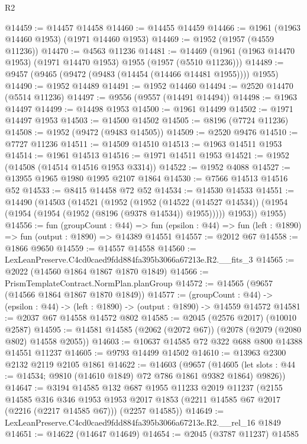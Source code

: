 \begin{lexlean}{R2}
\begin{coremodule}
@14459 := @14457 @14458
@14460 := @14455 @14459
@14466 := @1961 (@1963 @14460 @1953) (@1971 @14460 @1953)
@14469 := @1952 (@1957 (@4559 @11236))
@14470 := @4563 @11236
@14481 := @14469 (@1961 (@1963 @14470 @1953) (@1971 @14470 @1953) @1955 (@1957 (@5510 @11236)))
@14489 := @9457 (@9465 (@9472 (@9483 (@14454 (@14466 @14481 @1955)))) @1955)
@14490 := @1952 @14489
@14491 := @1952 @14460
@14494 := @2520 @14470 (@5514 @11236)
@14497 := @9556 (@9557 (@14491 @14494))
@14498 := @1963 @14497
@14499 := @14498 @1953
@14500 := @1961 @14499
@14502 := @1971 @14497 @1953
@14503 := @14500 @14502
@14505 := @8196 (@7724 @11236)
@14508 := @1952 (@9472 (@9483 @14505))
@14509 := @2520 @9476
@14510 := @7727 @11236
@14511 := @14509 @14510
@14513 := @1963 @14511 @1953
@14514 := @1961 @14513
@14516 := @1971 @14511 @1953
@14521 := @1952 (@14508 (@14514 @14516 @1953 @3314))
@14522 := @1952 @4088
@14527 := @13955 @1965 @1980 @1995 @2107 @1864
@14530 := @7566 @14513 @14516 @52
@14533 := @8415 @14458 @72 @52
@14534 := @14530 @14533
@14551 := @14490
    (@14503
      (@14521
        (@1952
          (@1952
            (@14522 (@14527 @14534))
            (@1954 (@1954 (@1954 (@1952 (@8196 (@9378 @14534)) @1955)))))
          @1953))
      @1955)
@14556 := fun (groupCount : @44) =>
  fun (epsilon : @44) => fun (left : @1890) => fun (output : @1890) => @14389 @14551
@14557 := @2012 @67
@14558 := @1866 @9650
@14559 := @14557 @14558
@14560 := LexLeanPreserve.C4cd0caed9fdd884fa395b3066a67213e.R2.__fits_3
@14565 := @2022 (@14560 @1864 @1867 @1870 @1849)
@14566 := PrismTemplateContract.NormPlan.planGroup
@14572 := @14565 (@9657 (@14566 @1864 @1867 @1870 @1849))
@14577 := (groupCount : @44) ->
  (epsilon : @44) -> (left : @1890) -> (output : @1890) -> @14559 @14572
@14581 := @2037 @67 @14558 @14572 @802
@14585 := @2045 (@2576 @2017) (@10010 @2587)
@14595 := @14581 @14585 (@2062 (@2072 @67)) (@2078 (@2079 (@2080 @802) @14558 @2055))
@14603 := @10637 @14585 @72 @322 @688 @800 @14388 @14551 @11237
@14605 := @9793 @14499 @14502
@14610 := @13963 @2300 @2132 @2119 @2105 @1861
@14622 := @14603
    (@9657
      (@14605 (let slots : @44 := @14534; @9810 (@14610 @1849) @72 @786 @1861 @9382 @1864) @9826))
@14647 := @3194
    @14585
    @132
    @687
    @1955
    @11233
    @2019
    @11237
    (@2155
      @14585
      @316
      @346
      @1953
      @1953
      @2017
      @1853
      (@2211 @14585 @67 @2017 (@2216 (@2217 @14585 @67)))
      (@2257 @14585))
@14649 := LexLeanPreserve.C4cd0caed9fdd884fa395b3066a67213e.R2.__rel_16 @1849
@14651 := @14622 (@14647 @14649)
@14654 := @2045 (@3787 @11237) @14585

\end{coremodule}
\end{lexlean}
